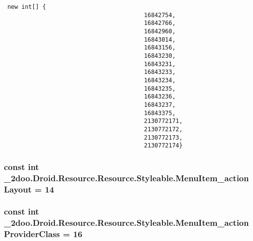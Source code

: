 \begin{Code}\begin{verbatim} new int[] {
                                        16842754,
                                        16842766,
                                        16842960,
                                        16843014,
                                        16843156,
                                        16843230,
                                        16843231,
                                        16843233,
                                        16843234,
                                        16843235,
                                        16843236,
                                        16843237,
                                        16843375,
                                        2130772171,
                                        2130772172,
                                        2130772173,
                                        2130772174}
\end{verbatim}
\end{Code}
\hypertarget{class__2doo_1_1_droid_1_1_resource_1_1_styleable_622a951884131fdf0de2173aa7f6d1a5}{
\subsubsection[{MenuItem\_\-actionLayout}]{\setlength{\rightskip}{0pt plus 5cm}const int \_\-2doo.Droid.Resource.Resource.Styleable.MenuItem\_\-actionLayout = 14}}
\label{class__2doo_1_1_droid_1_1_resource_1_1_styleable_622a951884131fdf0de2173aa7f6d1a5}


\hypertarget{class__2doo_1_1_droid_1_1_resource_1_1_styleable_b65d0722ae0c1a4cc14854f1cfbf3ad9}{
\subsubsection[{MenuItem\_\-actionProviderClass}]{\setlength{\rightskip}{0pt plus 5cm}const int \_\-2doo.Droid.Resource.Resource.Styleable.MenuItem\_\-actionProviderClass = 16}}
\label{class__2doo_1_1_droid_1_1_resource_1_1_styleable_b65d0722ae0c1a4cc14854f1cfbf3ad9}


